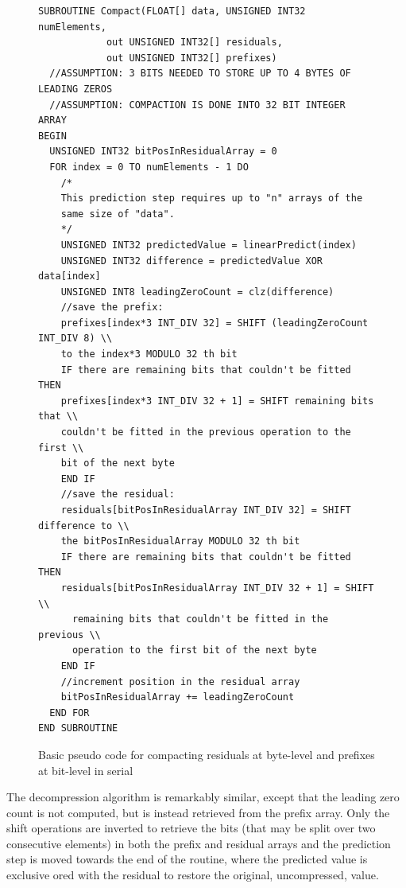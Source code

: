 \begin{figure}[ht!]
\begin{mdframed}
\begin{lstlisting}
SUBROUTINE Compact(FLOAT[] data, UNSIGNED INT32 numElements, 
		    out UNSIGNED INT32[] residuals, 
		    out UNSIGNED INT32[] prefixes)
  //ASSUMPTION: 3 BITS NEEDED TO STORE UP TO 4 BYTES OF LEADING ZEROS
  //ASSUMPTION: COMPACTION IS DONE INTO 32 BIT INTEGER ARRAY
BEGIN
  UNSIGNED INT32 bitPosInResidualArray = 0
  FOR index = 0 TO numElements - 1 DO
    /*
    This prediction step requires up to "n" arrays of the 
    same size of "data".
    */
    UNSIGNED INT32 predictedValue = linearPredict(index) 
    UNSIGNED INT32 difference = predictedValue XOR data[index]
    UNSIGNED INT8 leadingZeroCount = clz(difference)
    //save the prefix:
    prefixes[index*3 INT_DIV 32] = SHIFT (leadingZeroCount INT_DIV 8) \\
	to the index*3 MODULO 32 th bit
    IF there are remaining bits that couldn't be fitted THEN
	prefixes[index*3 INT_DIV 32 + 1] = SHIFT remaining bits that \\ 
	couldn't be fitted in the previous operation to the first \\
	bit of the next byte
    END IF
    //save the residual:
    residuals[bitPosInResidualArray INT_DIV 32] = SHIFT difference to \\
	the bitPosInResidualArray MODULO 32 th bit
    IF there are remaining bits that couldn't be fitted THEN
	residuals[bitPosInResidualArray INT_DIV 32 + 1] = SHIFT \\
	  remaining bits that couldn't be fitted in the previous \\ 
	  operation to the first bit of the next byte
    END IF  
    //increment position in the residual array
    bitPosInResidualArray += leadingZeroCount
  END FOR
END SUBROUTINE 
\end{lstlisting}
\caption[Compaction algorithm pseudo code]{Basic pseudo code for compacting residuals at byte-level and prefixes at bit-level in serial}
\label{BASIC_PSEUDO}
\end{mdframed}
\end{figure}

The decompression algorithm is remarkably similar, except that the leading zero count is not computed, but is instead retrieved from the prefix array. Only the shift
operations are inverted to retrieve the bits (that may be split over two consecutive elements) in both the prefix and residual arrays and the prediction step is moved towards
the end of the routine, where the predicted value is exclusive ored with the residual to restore the original, uncompressed, value.
